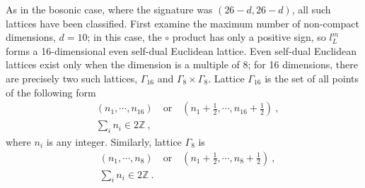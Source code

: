 As in the bosonic case, where the signature was $(26-d,26-d)$, all such lattices have been classified. First examine the maximum number of non-compact dimensions, $d=10$; in this case, the $\circ$ product has only a positive sign, so $l_{L}^{m}$ forms a 16-dimensional even self-dual Euclidean lattice. Even self-dual Euclidean lattices exist only when the dimension is a multiple of 8; for 16 dimensions, there are precisely two such lattices, $\Gamma_{16}$ and $\Gamma_{8}\times \Gamma_{8}$. Lattice $\Gamma_{16}$ is the set of all points of the following form
\begin{subequations}
	\begin{align}
		&(n_{1},\cdots,n_{16})\quad \text{or} \quad (n_{1}+\tfrac{1}{2},\cdots ,n_{16}+\tfrac{1}{2}) \:, \label{11.6.5a} \\
		&\sum_{i}n_{i} \in 2\mathds{Z} \:, \label{11.6.5b}
	\end{align}  \label{11.6.5}
\end{subequations}
where $n_{i}$ is any integer. Similarly, lattice $\Gamma_{8}$ is
\begin{subequations}
	\begin{align}
		&(n_{1},\cdots,n_{8})\quad \text{or} \quad (n_{1}+\tfrac{1}{2},\cdots ,n_{8}+\tfrac{1}{2}) \:, \label{11.6.6a} \\
		&\sum_{i}n_{i} \in 2\mathds{Z} \:. \label{11.6.6b}
	\end{align} \label{11.6.6}
\end{subequations}
